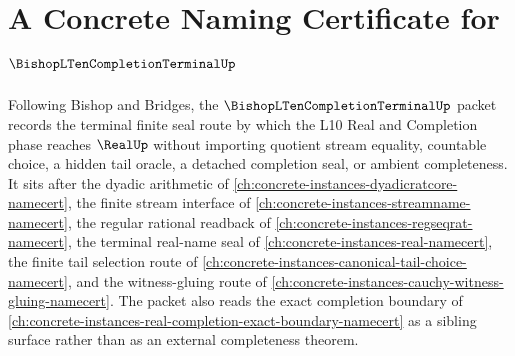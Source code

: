 \chapter{A Concrete Naming Certificate for $\BishopLTenCompletionTerminalUp$}
\label{ch:concrete-instances-bishop-l10-completion-terminal-namecert}

Following Bishop and Bridges, the $\BishopLTenCompletionTerminalUp$ packet records the terminal finite seal route by which the L10 Real and Completion phase reaches $\RealUp$ without importing quotient stream equality, countable choice, a hidden tail oracle, a detached completion seal, or ambient completeness. It sits after the dyadic arithmetic of \autoref{ch:concrete-instances-dyadicratcore-namecert}, the finite stream interface of \autoref{ch:concrete-instances-streamname-namecert}, the regular rational readback of \autoref{ch:concrete-instances-regseqrat-namecert}, the terminal real-name seal of \autoref{ch:concrete-instances-real-namecert}, the finite tail selection route of \autoref{ch:concrete-instances-canonical-tail-choice-namecert}, and the witness-gluing route of \autoref{ch:concrete-instances-cauchy-witness-gluing-namecert}. The packet also reads the exact completion boundary of \autoref{ch:concrete-instances-real-completion-exact-boundary-namecert} as a sibling surface rather than as an external completeness theorem.

